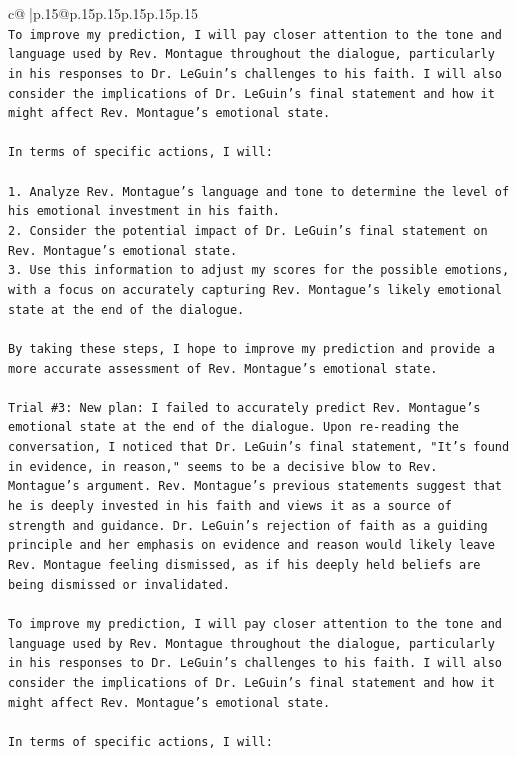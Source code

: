 \documentclass{article}
\begin{document}
{\begin{supertabular}{c@{$\;$}|p{.15\linewidth}@{}p{.15\linewidth}p{.15\linewidth}p{.15\linewidth}p{.15\linewidth}p{.15\linewidth}}
{{{\\ 
\texttt{To improve my prediction, I will pay closer attention to the tone and language used by Rev. Montague throughout the dialogue, particularly in his responses to Dr. LeGuin's challenges to his faith. I will also consider the implications of Dr. LeGuin's final statement and how it might affect Rev. Montague's emotional state.} \\
\\ 
\texttt{In terms of specific actions, I will:} \\
\\ 
\texttt{1. Analyze Rev. Montague's language and tone to determine the level of his emotional investment in his faith.} \\
\texttt{2. Consider the potential impact of Dr. LeGuin's final statement on Rev. Montague's emotional state.} \\
\texttt{3. Use this information to adjust my scores for the possible emotions, with a focus on accurately capturing Rev. Montague's likely emotional state at the end of the dialogue.} \\
\\ 
\texttt{By taking these steps, I hope to improve my prediction and provide a more accurate assessment of Rev. Montague's emotional state.} \\
\\ 
\texttt{Trial \#3: New plan: I failed to accurately predict Rev. Montague's emotional state at the end of the dialogue. Upon re{-}reading the conversation, I noticed that Dr. LeGuin's final statement, "It's found in evidence, in reason," seems to be a decisive blow to Rev. Montague's argument. Rev. Montague's previous statements suggest that he is deeply invested in his faith and views it as a source of strength and guidance. Dr. LeGuin's rejection of faith as a guiding principle and her emphasis on evidence and reason would likely leave Rev. Montague feeling dismissed, as if his deeply held beliefs are being dismissed or invalidated.} \\
\\ 
\texttt{To improve my prediction, I will pay closer attention to the tone and language used by Rev. Montague throughout the dialogue, particularly in his responses to Dr. LeGuin's challenges to his faith. I will also consider the implications of Dr. LeGuin's final statement and how it might affect Rev. Montague's emotional state.} \\
\\ 
\texttt{In terms of specific actions, I will:} \\
}}}
\end{supertabular}}
\end{document}
